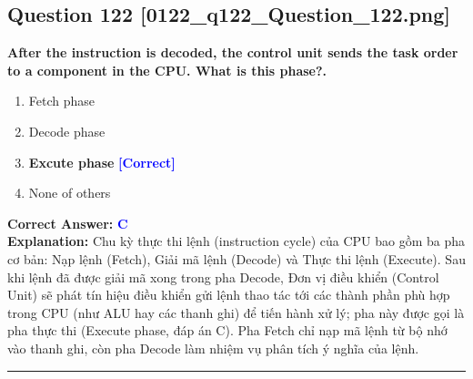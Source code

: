 \documentclass[11pt,a4paper]{article}
\begin{document}
\begin{minipage}{\textwidth}
\subsection*{Question 122 \quad \footnotesize{[0122\_q122\_Question\_122.png]}}
\noindent \textbf{After the instruction is decoded, the control unit sends the task order to a component in the CPU. What is this phase?.}

\begin{enumerate}[label=\Alph*.]
    \item Fetch phase
    \item Decode phase
    \item \textbf{Excute phase} \hfill \textcolor{blue}{\textbf{[Correct]}}
    \item None of others
\end{enumerate}

\noindent \textbf{Correct Answer:} \textcolor{blue}{\textbf{C}} \\[2pt]
\noindent \textbf{Explanation:} Chu kỳ thực thi lệnh (instruction cycle) của CPU bao gồm ba pha cơ bản: Nạp lệnh (Fetch), Giải mã lệnh (Decode) và Thực thi lệnh (Execute). Sau khi lệnh đã được giải mã xong trong pha Decode, Đơn vị điều khiển (Control Unit) sẽ phát tín hiệu điều khiển gửi lệnh thao tác tới các thành phần phù hợp trong CPU (như ALU hay các thanh ghi) để tiến hành xử lý; pha này được gọi là pha thực thi (Execute phase, đáp án C). Pha Fetch chỉ nạp mã lệnh từ bộ nhớ vào thanh ghi, còn pha Decode làm nhiệm vụ phân tích ý nghĩa của lệnh.

\par\vspace{0.3cm}
\hrule
\vspace{0.3cm}
\end{minipage}
\end{document}
